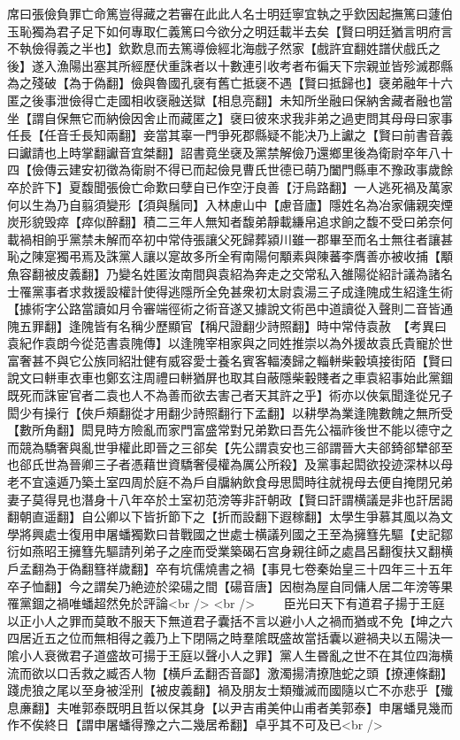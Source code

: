 席曰張儉負罪亡命篤豈得藏之若審在此此人名士明廷寧宜執之乎欽因起撫篤曰蘧伯玉恥獨為君子足下如何專取仁義篤曰今欲分之明廷載半去矣【賢曰明廷猶言明府言不執儉得義之半也】欽歎息而去篤導儉經北海戲子然家【戲許宜翻姓譜伏戲氏之後】遂入漁陽出塞其所經歷伏重誅者以十數連引收考者布徧天下宗親並皆殄滅郡縣為之殘破【為于偽翻】儉與魯國孔襃有舊亡抵襃不遇【賢曰抵歸也】襃弟融年十六匿之後事泄儉得亡走國相收襃融送獄【相息亮翻】未知所坐融曰保納舍藏者融也當坐【謂自保無它而納儉因舍止而藏匿之】襃曰彼來求我非弟之過吏問其母母曰家事任長【任音壬長知兩翻】妾當其辜一門爭死郡縣疑不能决乃上讞之【賢曰前書音義曰讞請也上時掌翻讞音宜桀翻】詔書竟坐襃及黨禁解儉乃還鄉里後為衛尉卒年八十四【儉傳云建安初徵為衛尉不得已而起儉見曹氏世德已萌乃闔門縣車不豫政事歲餘卒於許下】夏馥聞張儉亡命歎曰孽自已作空汙良善【汙烏路翻】一人逃死禍及萬家何以生為乃自翦須變形【須與鬚同】入林慮山中【慮音廬】隱姓名為冶家傭親突煙炭形貌毁瘁【瘁似醉翻】積二三年人無知者馥弟靜載縑帛追求餉之馥不受曰弟奈何載禍相餉乎黨禁未解而卒初中常侍張讓父死歸葬潁川雖一郡畢至而名士無往者讓甚恥之陳寔獨弔焉及誅黨人讓以寔故多所全宥南陽何顒素與陳蕃李膺善亦被收捕【顒魚容翻被皮義翻】乃變名姓匿汝南間與袁紹為奔走之交常私入雒陽從紹計議為諸名士罹黨事者求救援設權計使得逃隱所全免甚衆初太尉袁湯三子成逢隗成生紹逢生術【據術字公路當讀如月令審端徑術之術音遂又據說文術邑中道讀從入聲則二音皆通隗五罪翻】逢隗皆有名稱少歷顯官【稱尺證翻少詩照翻】時中常侍袁赦　【考異曰袁紀作袁朗今從范書袁隗傳】以逢隗宰相家與之同姓推崇以為外援故袁氏貴寵於世富奢甚不與它公族同紹壯健有威容愛士養名賓客輻湊歸之輜軿柴轂填接街陌【賢曰說文曰軿車衣車也鄭玄注周禮曰軿猶屏也取其自蔽隱柴轂賤者之車袁紹事始此黨錮既死而誅宦官者二袁也人不為善而欲去害己者天其許之乎】術亦以俠氣聞逢從兄子閎少有操行【俠戶頰翻從才用翻少詩照翻行下孟翻】以耕學為業逢隗數餽之無所受【數所角翻】閎見時方險亂而家門富盛常對兄弟歎曰吾先公福祚後世不能以德守之而競為驕奢與亂世爭權此即晉之三郤矣【先公謂袁安也三郤謂晉大夫郤錡郤犫郤至也郤氏世為晉卿三子者憑藉世資驕奢侵權為厲公所殺】及黨事起閎欲投迹深林以母老不宜遠遁乃築土室四周於庭不為戶自牖納飲食母思閎時往就視母去便自掩閉兄弟妻子莫得見也潛身十八年卒於土室初范滂等非訐朝政【賢曰訐謂横議是非也訐居謁翻朝直遥翻】自公卿以下皆折節下之【折而設翻下遐稼翻】太學生爭慕其風以為文學將興處士復用申屠蟠獨歎曰昔戰國之世處士横議列國之王至為擁篲先驅【史記鄒衍如燕昭王擁篲先驅請列弟子之座而受業築碣石宫身親往師之處昌呂翻復扶又翻横戶孟翻為于偽翻篲祥歲翻】卒有坑儒燒書之禍【事見七卷秦始皇三十四年三十五年卒子恤翻】今之謂矣乃絶迹於梁碭之間【碭音唐】因樹為屋自同傭人居二年滂等果罹黨錮之禍唯蟠超然免於評論<br />
<br />
　　臣光曰天下有道君子揚于王庭以正小人之罪而莫敢不服天下無道君子囊括不言以避小人之禍而猶或不免【坤之六四居近五之位而無相得之義乃上下閉隔之時羣隂既盛故當括囊以避禍夬以五陽決一隂小人衰微君子道盛故可揚于王庭以聲小人之罪】黨人生昬亂之世不在其位四海横流而欲以口舌救之臧否人物【横戶孟翻否音鄙】激濁揚清撩虺蛇之頭【撩連條翻】踐虎狼之尾以至身被淫刑【被皮義翻】禍及朋友士類殱滅而國隨以亡不亦悲乎【殱息亷翻】夫唯郭泰既明且哲以保其身【以尹吉甫美仲山甫者美郭泰】申屠蟠見幾而作不俟終日【謂申屠蟠得豫之六二幾居希翻】卓乎其不可及已<br />
